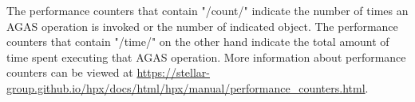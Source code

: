 The performance counters that contain "/count/" indicate the number of times an
AGAS operation is invoked or the number of indicated object. The performance
counters that contain "/time/" on the other hand indicate the total amount of
time spent executing that AGAS operation. More information about performance
counters can be viewed at
\url{https://stellar-group.github.io/hpx/docs/html/hpx/manual/performance_counters.html}.


